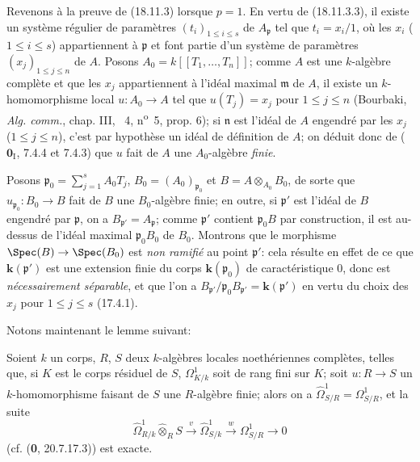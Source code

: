 Revenons à la preuve de (18.11.3) lorsque $p=1$. En vertu de (18.11.3.3), il existe un système régulier de paramètres $(t_i)_{1\leq i\leq s}$ de $A_{\mathfrak p}$ tel que $t_i=x_i/1$, où les $x_i$ ($1\leq i\leq s$) appartiennent à $\mathfrak p$ et font partie d'un système de paramètres $(x_j)_{1\leq j\leq n}$ de $A$. Posons $A_0=k[[T_1,\ldots,T_n]]$; comme $A$ est une $k$-algèbre complète et que les $x_j$ appartiennent à l'idéal maximal $\mathfrak m$ de $A$, il existe un $k$-homomorphisme local $u:A_0\to A$ tel que $u(T_j)=x_j$ pour $1\leq j\leq n$ (Bourbaki, \emph{Alg. comm.}, chap. III, \textsection~4, n\textsuperscript{o}~5, prop. 6); si $\mathfrak n$ est l'idéal de $A$ engendré par les $x_j$ ($1\leq j\leq n$), c'est par hypothèse un idéal de définition de $A$; on déduit donc de ($\mathbf{0}_{\mathrm I}$, 7.4.4 et 7.4.3) que $u$ fait de $A$ une $A_0$-algèbre \emph{finie}.

Posons $\mathfrak p_0=\sum_{j=1}^s A_0T_j$, $B_0=(A_0)_{\mathfrak p_0}$ et $B=A\otimes_{A_0}B_0$, de sorte que $u_{\mathfrak p_0}:B_0\to B$ fait
de $B$ une $B_0$-algèbre finie; en outre, si $\mathfrak p'$ est l'idéal de $B$ engendré par $\mathfrak p$, on a $B_{\mathfrak p'}=A_{\mathfrak p}$; comme $\mathfrak p'$ contient $\mathfrak p_0B$ par construction, il est au-dessus de l'idéal maximal $\mathfrak p_0B_0$ de $B_0$. Montrons que le morphisme $\Spec(B)\to\Spec(B_0)$ est \emph{non ramifié} au point $\mathfrak p'$: cela résulte en effet de ce que $\boldsymbol{k}(\mathfrak p')$ est une extension finie du corps $\boldsymbol{k}(\mathfrak p_0)$ de caractéristique 0, donc est \emph{nécessairement séparable}, et que l'on a $B_{\mathfrak p'}/\mathfrak p_0B_{\mathfrak p'}=\boldsymbol{k}(\mathfrak p')$ en vertu du choix des $x_j$ pour $1\leq j\leq s$ (17.4.1).

Notons maintenant le lemme suivant:

\begin{lemma}[18.11.3.5]
\label{IV.18.11.3.5}
Soient $k$ un corps, $R$, $S$ deux $k$-algèbres locales noethériennes complètes, telles que, si $K$ est le corps résiduel de $S$, $\Omega^1_{K/k}$ soit de rang fini sur $K$; soit $u:R\to S$ un $k$-homomorphisme faisant de $S$ une $R$-algèbre finie; alors on a $\hat{\Omega}^1_{S/R}=\Omega^1_{S/R}$, et la suite
\begin{equation}
\label{IV.18.11.3.6}
\tag{18.11.3.6}
  \hat{\Omega}^1_{R/k}\widehat{\otimes}_R S\xrightarrow{v}\hat{\Omega}^1_{S/k}\xrightarrow{w}\Omega^1_{S/R}\to0
\end{equation}
\textup{(cf. (\textbf{0}, 20.7.17.3))} est exacte.
\end{lemma}

